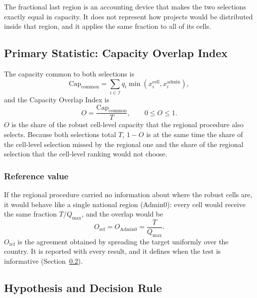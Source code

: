 The fractional last region is an accounting device that makes the two
selections exactly equal in capacity. It does not represent how projects would
be distributed inside that region, and it applies the same fraction to all of
its cells.

\subsection{Primary Statistic: Capacity Overlap Index}
\label{subsec:h2_overlap}

The capacity common to both selections is
\begin{equation}
    \mathrm{Cap}_{\mathrm{common}}
    =\sum_{i\in\mathcal{I}}q_i\min\!\left(x^{\mathrm{cell}}_i,x^{\mathrm{admin}}_i\right),
    \label{eq:h2_common_capacity}
\end{equation}
and the Capacity Overlap Index is
\begin{equation}
    O=\frac{\mathrm{Cap}_{\mathrm{common}}}{T},\qquad 0\leq O\leq 1 .
    \label{eq:h2_overlap}
\end{equation}
$O$ is the share of the robust cell-level capacity that the regional procedure
also selects. Because both selections total $T$, $1-O$ is at the same time the
share of the cell-level selection missed by the regional one and the share of
the regional selection that the cell-level ranking would not choose.

\subsubsection{Reference value}

If the regional procedure carried no information about where the robust cells
are, it would behave like a single national region (Admin0): every cell would
receive the same fraction $T/Q_{\max}$, and the overlap would be
\begin{equation}
    O_{\mathrm{ref}}=O_{\mathrm{Admin0}}=\frac{T}{Q_{\max}} .
    \label{eq:h2_reference}
\end{equation}
$O_{\mathrm{ref}}$ is the agreement obtained by spreading the target uniformly
over the country. It is reported with every result, and it defines when the
test is informative (Section~\ref{subsec:h2_rule}).

\subsection{Hypothesis and Decision Rule}
\label{subsec:h2_rule}

